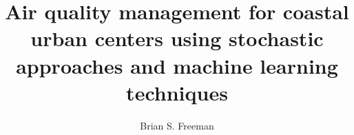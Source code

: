 
\title{Air quality management for coastal urban centers using stochastic approaches and machine learning techniques}
\author{Brian S. Freeman}
%
%
%
%
\chair{  }
%
\othermembers{ }
%
%
%


\maketitle



